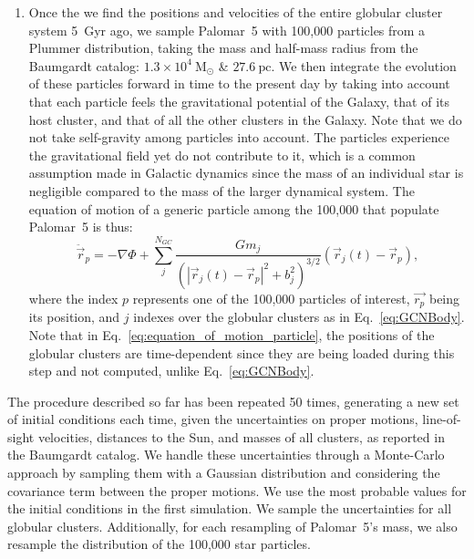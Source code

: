 \documentclass{aa}
\begin{document}
\begin{enumerate}
        \item Once the we find the positions and velocities of the entire globular cluster system 5~Gyr ago, we sample Palomar~5 with 100,000 particles from a Plummer distribution, taking the mass and half-mass radius from the Baumgardt catalog: $1.3\times10^{4}~\textrm{M}_\odot$ \& $27.6~\textrm{pc}$. We then integrate the evolution of these particles forward in time to the present day by taking into account that each particle feels the gravitational potential of the Galaxy, that of its host cluster, and that of all the other clusters in the Galaxy. Note that we do not take self-gravity among particles into account. The particles experience the gravitational field yet do not contribute to it, which is a common assumption made in Galactic dynamics since the mass of an individual star is negligible compared to the mass of the larger dynamical system. The equation of motion of a generic particle among the 100,000 that populate Palomar~5 is thus: 
        \begin{equation}
          \ddot{\vec{r}}_p = -\nabla \Phi + \left.\sum_{j}^{N_{GC}} \frac{Gm_j}{\left(|\vec{r}_j(t) - \vec{r}_p|^2 + b_j^2\right)^{3/2}}\right. \left(\vec{r}_j(t)- \vec{r}_p\right),
          \end{equation} \label{eq:equation_of_motion_particle} where the index $p$ represents one of the 100,000 particles of interest, $\vec{r_p}$ being its position, and $j$ indexes over the globular clusters as in Eq.~\ref{eq:GCNBody}. Note that in Eq.~\ref{eq:equation_of_motion_particle}, the positions of the globular clusters are time-dependent since they are being loaded during this step and not computed, unlike Eq.~\ref{eq:GCNBody}. 

      \end{enumerate}




        The procedure described so far has been repeated 50 times, generating a new set of initial conditions each time, given the uncertainties on proper motions, line-of-sight velocities, distances to the Sun, and masses of all clusters, as reported in the Baumgardt catalog. We handle these uncertainties through a Monte-Carlo approach by sampling them with a Gaussian distribution and considering the covariance term between the proper motions. We use the most probable values for the initial conditions in the first simulation. We sample the uncertainties for all globular clusters. Additionally, for each resampling of Palomar~5's mass, we also resample the distribution of the 100,000 star particles. 
\end{document}
